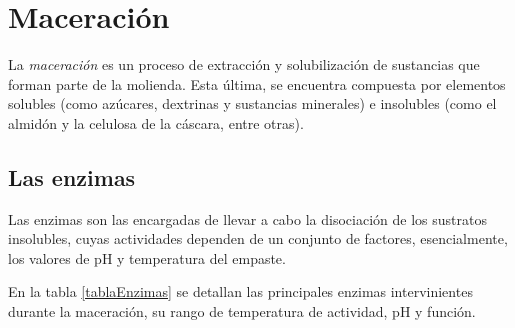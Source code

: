     \section{Maceración}
        \par La \textit{maceración} es un proceso de extracción y solubilización de sustancias que forman parte de la molienda. Esta última, se encuentra compuesta por elementos solubles (como azúcares, dextrinas y sustancias minerales) e insolubles (como el almidón y la celulosa de la cáscara, entre otras).
        
        \subsection{Las enzimas}
            \par Las enzimas son las encargadas de llevar a cabo la disociación de los sustratos insolubles, cuyas actividades dependen de un conjunto de factores, esencialmente, los valores de pH y temperatura del empaste. 
           
            \par En la tabla \ref{tablaEnzimas} se detallan las principales enzimas intervinientes durante la maceración, su rango de temperatura de actividad, pH y función.
            
